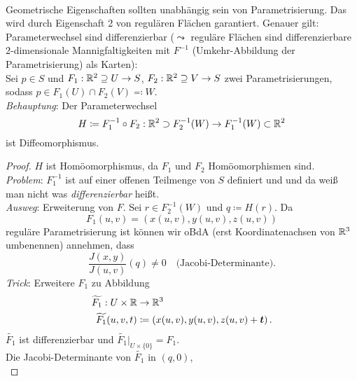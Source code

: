 \begin{remark}
  \ \\
  Geometrische Eigenschaften sollten unabhängig sein von Parametrisierung. Das wird durch Eigenschaft 2 von regulären Flächen garantiert. Genauer gilt: Parameterwechsel sind differenzierbar ($ \leadsto $ reguläre Flächen sind differenzierbare $ 2 $-dimensionale Mannigfaltigkeiten mit $ F^{-1} $ (Umkehr-Abbildung der Parametrisierung) als Karten): \\
  Sei $ p \in S $ und $ F_1 : \mathbb{R}^2 \supseteq U \to S $, $ F_2: \mathbb{R}^2 \supseteq V \to S $ zwei Parametrisierungen, sodass $ p \in F_1(U) \cap F_2(V) \eqqcolon W $. \\
  \emph{Behauptung}: Der Parameterwechsel 
  \begin{equation*}
    H \coloneqq F_1^{-1} \circ F_2 : \mathbb{R}^2 \supset F_2^{-1}(W) \to F_1^{-1}(W) \subset \mathbb{R}^2
  \end{equation*}
  ist Diffeomorphismus.
  \begin{proof}
    $ H $ ist Homöomorphismus, da $ F_1 $ und $ F_2 $ Homöomorphismen sind. \\
    \emph{Problem}: $ F_1^{-1} $ ist auf einer offenen Teilmenge von $ S $ definiert und und da weiß man nicht was \emph{differenzierbar} heißt. \\
    \emph{Ausweg}: Erweiterung von $ F $. Sei $ r \in F_2^{-1}(W) $ und $ q \coloneqq H(r) $. Da
      \begin{equation*}
        F_1(u,v) = \left( x(u,v),y(u,v),z(u,v) \right)
      \end{equation*}
    reguläre Parametrisierung ist können wir oBdA (erst Koordinatenachsen von $ \mathbb{R}^3 $ umbenennen) annehmen, dass
    \begin{equation*}
      \frac{J(x,y)}{J(u,v)}(q) \neq 0 \quad \text{(Jacobi-Determinante).}
    \end{equation*}
    \emph{Trick}: Erweitere $ F_1 $ zu Abbildung
    \begin{align*}
      \widetilde{F_1} : U \times \mathbb{R} &\to \mathbb{R}^3 \\
        \widetilde{F_1}(u,v,t) &\coloneqq \left( x(u,v),y(u,v),z(u,v)+\bm{t} \right)\text{.}
    \end{align*}
    $ \widetilde{F_1} $ ist differenzierbar und $ \widetilde{F_1}|_{U \times \{ 0 \}} = F_1 $. \\
    Die Jacobi-Determinante von $ \widetilde{F_1} $ in $ (q,0) $,
    \begin{equation*}

\end{equation*}
\end{proof}
\end{remark}
